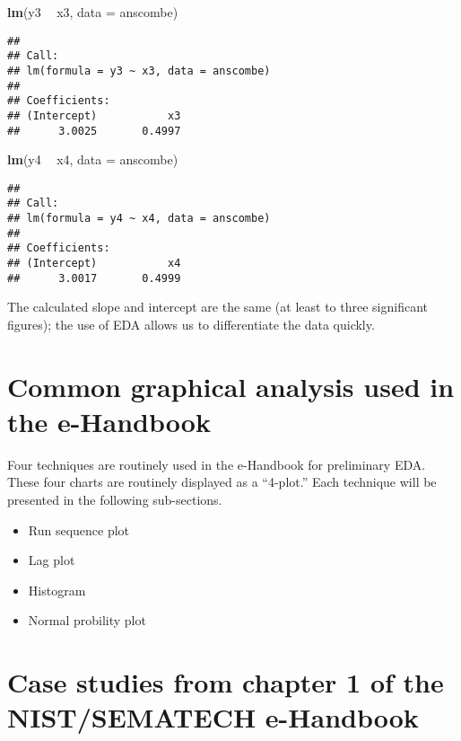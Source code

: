 \documentclass[]{book}
\newenvironment{Shaded}{\begin{snugshade}}{\end{snugshade}}
\newcommand{\DataTypeTok}[1]{\textcolor[rgb]{0.13,0.29,0.53}{#1}}
\newcommand{\KeywordTok}[1]{\textcolor[rgb]{0.13,0.29,0.53}{\textbf{#1}}}
\newcommand{\NormalTok}[1]{#1}
\newcommand{\OperatorTok}[1]{\textcolor[rgb]{0.81,0.36,0.00}{\textbf{#1}}}
\newcommand{\StringTok}[1]{\textcolor[rgb]{0.31,0.60,0.02}{#1}}
\providecommand{\tightlist}{%
  \setlength{\itemsep}{0pt}\setlength{\parskip}{0pt}}
\theoremstyle{definition}
\theoremstyle{definition}
\theoremstyle{definition}
\theoremstyle{remark}
\begin{document}
\begin{Shaded}
\begin{Highlighting}[]
\KeywordTok{lm}\NormalTok{(y3 }\OperatorTok{~}\StringTok{ }\NormalTok{x3, }\DataTypeTok{data =}\NormalTok{ anscombe)}
\end{Highlighting}
\end{Shaded}

\begin{verbatim}
## 
## Call:
## lm(formula = y3 ~ x3, data = anscombe)
## 
## Coefficients:
## (Intercept)           x3  
##      3.0025       0.4997
\end{verbatim}

\begin{Shaded}
\begin{Highlighting}[]
\KeywordTok{lm}\NormalTok{(y4 }\OperatorTok{~}\StringTok{ }\NormalTok{x4, }\DataTypeTok{data =}\NormalTok{ anscombe)}
\end{Highlighting}
\end{Shaded}

\begin{verbatim}
## 
## Call:
## lm(formula = y4 ~ x4, data = anscombe)
## 
## Coefficients:
## (Intercept)           x4  
##      3.0017       0.4999
\end{verbatim}

The calculated slope and intercept are the same (at least to three
significant figures); the use of EDA allows us to differentiate the data
quickly.

\hypertarget{common-graphical-analysis-used-in-the-e-handbook}{%
\section{Common graphical analysis used in the
e-Handbook}\label{common-graphical-analysis-used-in-the-e-handbook}}

Four techniques are routinely used in the e-Handbook for preliminary
EDA. These four charts are routinely displayed as a ``4-plot.'' Each
technique will be presented in the following sub-sections.

\begin{itemize}
\tightlist
\item
  Run sequence plot
\item
  Lag plot
\item
  Histogram
\item
  Normal probility plot
\end{itemize}

\hypertarget{case-studies-from-chapter-1-of-the-nistsematech-e-handbook}{%
\section{Case studies from chapter 1 of the NIST/SEMATECH
e-Handbook}\label{case-studies-from-chapter-1-of-the-nistsematech-e-handbook}}
\end{document}
